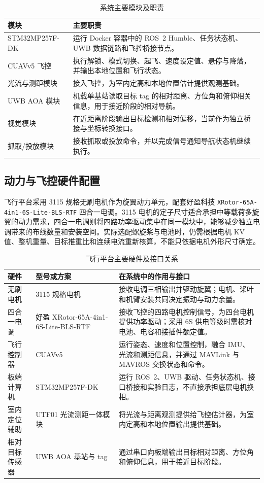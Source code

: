 \documentclass[12pt,a4paper]{ctexart}
\providecommand{\allowbreak}{\penalty0\relax}
\begin{document}
\begin{table}[htbp]
\centering
\caption{系统主要模块及职责}\label{tab:modules}
\begin{tabular}{p{3.3cm}p{10cm}}
\hline
模块 & 主要职责 \\
\hline
STM32MP257F-DK & 运行 Docker 容器中的 ROS~2 Humble、任务状态机、UWB 数据链路和飞控桥接节点。\\
CUAVv5 飞控 & 执行解锁、模式切换、起飞、速度设定值、悬停与降落，并输出本地位置和飞行状态。\\
光流与测距模块 & 接入飞控，为室内定高和本地位置估计提供观测基础。\\
UWB AOA 模块 & 机载单基站读取目标 tag 的相对距离、方位角和俯仰相关信息，用于接近阶段的相对导航。\\
视觉模块 & 在近距离阶段输出目标检测和相对偏移，当前作为独立桥接与坐标转换接口。\\
抓取/投放模块 & 接收抓取或投放命令，并以完成信号通知导航状态机继续执行。\\
\hline
\end{tabular}
\end{table}

\subsection{动力与飞控硬件配置}
飞行平台采用 3115 规格无刷电机作为旋翼动力单元，配套好盈科技 \texttt{XRotor-\allowbreak{}65A-\allowbreak{}4in1-\allowbreak{}6S-\allowbreak{}Lite-\allowbreak{}BLS-\allowbreak{}RTF} 四合一电调。3115 电机的定子尺寸适合承担中等载荷多旋翼的动力需求，四合一电调则将四路功率驱动集中在同一模块中，能够减少独立电调带来的布线数量和安装空间。实际选配螺旋桨与电池时，仍需根据电机 KV 值、整机重量、目标推重比和连续电流重新核算，不能只依据电机外形尺寸确定。

\begin{table}[htbp]
\centering
\caption{飞行平台主要硬件及接口关系}\label{tab:flight-hardware}
{
\begin{tabular}{p{3.0cm}p{4.0cm}p{6.1cm}}
\hline
硬件 & 型号或方案 & 在系统中的作用与接口 \\
\hline
无刷电机 & 3115 规格电机 & 接收电调三相输出并驱动旋翼；电机、桨叶和机臂安装共同决定振动与动力余量。\\
四合一电调 & 好盈 XRotor-\allowbreak{}65A-\allowbreak{}4in1-\allowbreak{}6S-\allowbreak{}Lite-\allowbreak{}BLS-\allowbreak{}RTF & 接收飞控的四路电机控制信号，为四台电机提供功率驱动；采用 6S 供电等级时需核对电池、电容和接插件额定值。\\
飞行控制器 & CUAVv5 & 运行姿态、速度和位置控制，融合 IMU、光流和测距信息，并通过 MAVLink 与 MAVROS 交换状态和命令。\\
板端计算机 & STM32MP257F-DK & 运行 ROS~2、UWB 驱动、任务状态机、接口桥接和实验日志，不直接承担底层电机换相。\\
室内定位辅助 & UTF01 光流测距一体模块 & 将光流与距离观测提供给飞控估计器，为室内定高和本地位置输出提供基础。\\
相对目标传感器 & UWB AOA 基站与 tag & 通过串口向板端输出目标相对距离、方位角和俯仰信息，用于接近目标阶段。\\
\hline
\end{tabular}
}
\end{table}
\end{document}
